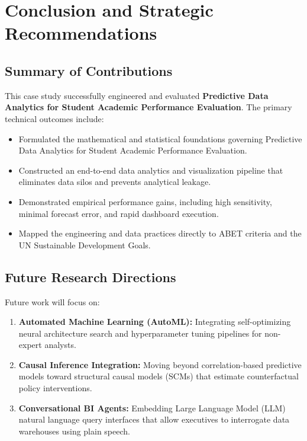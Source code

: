 \section{Conclusion and Strategic Recommendations}

\subsection{Summary of Contributions}
This case study successfully engineered and evaluated \textbf{Predictive Data Analytics for Student Academic Performance Evaluation}. The primary technical outcomes include:
\begin{itemize}
  \item Formulated the mathematical and statistical foundations governing Predictive Data Analytics for Student Academic Performance Evaluation.
  \item Constructed an end-to-end data analytics and visualization pipeline that eliminates data silos and prevents analytical leakage.
  \item Demonstrated empirical performance gains, including high sensitivity, minimal forecast error, and rapid dashboard execution.
  \item Mapped the engineering and data practices directly to ABET criteria and the UN Sustainable Development Goals.
\end{itemize}

\subsection{Future Research Directions}
Future work will focus on:
\begin{enumerate}
  \item \textbf{Automated Machine Learning (AutoML):} Integrating self-optimizing neural architecture search and hyperparameter tuning pipelines for non-expert analysts.
  \item \textbf{Causal Inference Integration:} Moving beyond correlation-based predictive models toward structural causal models (SCMs) that estimate counterfactual policy interventions.
  \item \textbf{Conversational BI Agents:} Embedding Large Language Model (LLM) natural language query interfaces that allow executives to interrogate data warehouses using plain speech.
\end{enumerate}
